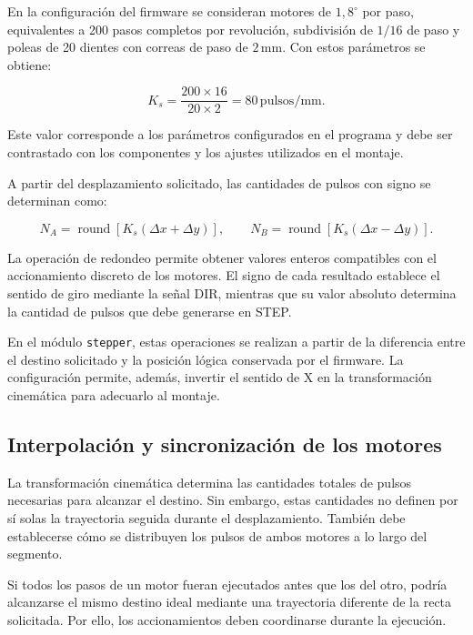 \documentclass[blue,fullpaper]{ludusofficial}  %
\begin{document}
En la configuración del firmware se consideran
motores de $1{,}8^\circ$ por paso, equivalentes
a 200 pasos completos por revolución, subdivisión
de $1/16$ de paso y poleas de 20 dientes con correas
de paso de $2\,\mathrm{mm}$. Con estos parámetros
se obtiene:

\begin{equation}
    K_s =
    \frac{200 \times 16}{20 \times 2}
    = 80\,\mathrm{pulsos/mm}.
\end{equation}

Este valor corresponde a los parámetros configurados
en el programa y debe ser contrastado con los
componentes y los ajustes utilizados en el montaje.

A partir del desplazamiento solicitado, las cantidades
de pulsos con signo se determinan como:

\begin{equation}
    N_A =
    \operatorname{round}
    \left[K_s(\Delta x + \Delta y)\right],
    \qquad
    N_B =
    \operatorname{round}
    \left[K_s(\Delta x - \Delta y)\right].
    \label{eq:pulsos-corexy}
\end{equation}

La operación de redondeo permite obtener valores
enteros compatibles con el accionamiento discreto
de los motores. El signo de cada resultado establece
el sentido de giro mediante la señal DIR, mientras
que su valor absoluto determina la cantidad
de pulsos que debe generarse en STEP.

En el módulo \texttt{stepper}, estas operaciones
se realizan a partir de la diferencia entre el
destino solicitado y la posición lógica conservada
por el firmware. La configuración permite, además,
invertir el sentido de X en la transformación
cinemática para adecuarlo al montaje.

\subsection{Interpolación y sincronización de los motores}

La transformación cinemática determina las cantidades
totales de pulsos necesarias para alcanzar el destino.
Sin embargo, estas cantidades no definen por sí solas
la trayectoria seguida durante el desplazamiento.
También debe establecerse cómo se distribuyen
los pulsos de ambos motores a lo largo del segmento.

Si todos los pasos de un motor fueran ejecutados
antes que los del otro, podría alcanzarse el mismo
destino ideal mediante una trayectoria diferente
de la recta solicitada. Por ello, los accionamientos
deben coordinarse durante la ejecución.
\end{document}
